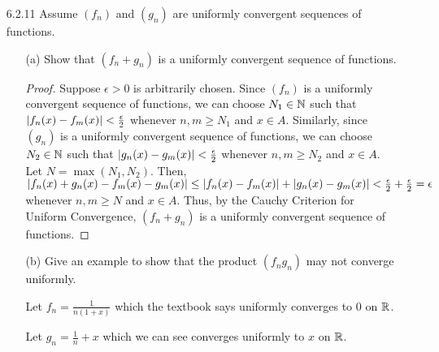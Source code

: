 \documentclass[12pt,letterpaper]{article}
\begin{document}
    \begin{itemize}[leftmargin=!,labelindent=5pt]
        \item [6.2.11] Assume $(f_n)$ and $(g_n)$ are uniformly convergent sequences of functions.
            \begin{itemize}
                \item [(a)] Show that $(f_n + g_n)$ is a uniformly convergent sequence of functions.
                    \begin{proof}
                        Suppose $\epsilon > 0$ is arbitrarily chosen.
                        Since $(f_n)$ is a uniformly convergent sequence of functions, we can choose $N_1 \in \mathbb{N}$ such that $\abs{f_n(x) - f_m(x)} < \frac{\epsilon}{2}$ whenever $n,m \geq N_1$ and $x \in A$.
                        Similarly, since $(g_n)$ is a uniformly convergent sequence of functions, we can choose $N_2 \in \mathbb{N}$ such that $\abs{g_n(x) - g_m(x)} < \frac{\epsilon}{2}$ whenever $n,m \geq N_2$ and $x \in A$.
                        Let $N = \max(N_1, N_2)$.
                        Then, $\abs{f_n(x) + g_n(x) - f_m(x) - g_m(x)} \leq \abs{f_n(x) - f_m(x)} + \abs{g_n(x) - g_m(x)} < \frac{\epsilon}{2} + \frac{\epsilon}{2} = \epsilon$ whenever $n,m \geq N$ and $x \in A$.
                        Thus, by the Cauchy Criterion for Uniform Convergence, $(f_n + g_n)$ is a uniformly convergent sequence of functions.
                    \end{proof}
                \item [(b)] Give an example to show that the product $(f_n g_n)$ may not converge uniformly.
                
                    Let $f_n = \frac{1}{n(1+x)}$ which the textbook says uniformly converges to $0$ on $\mathbb{R}$.

                    Let $g_n = \frac{1}{n} + x$ which we can see converges uniformly to $x$ on $\mathbb{R}$.


\end{itemize}
\end{itemize}
\end{document}

